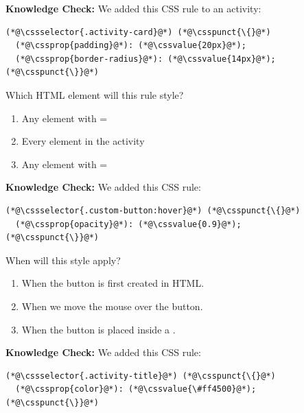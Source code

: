 \documentclass{article}
\begin{document}
\vspace{0.5cm}

\textbf{Knowledge Check:} We added this CSS rule to an activity:

\begin{lstlisting}
(*@\cssselector{.activity-card}@*) (*@\csspunct{\{}@*)
  (*@\cssprop{padding}@*): (*@\cssvalue{20px}@*);
  (*@\cssprop{border-radius}@*): (*@\cssvalue{14px}@*);
(*@\csspunct{\}}@*)
\end{lstlisting}

Which HTML element will this rule style?

\begin{enumerate}[label=\Alph*), topsep=4pt, itemsep=2pt, partopsep=0pt]
  \item Any element with =
  \item Every  element in the activity
  \item Any element with =
\end{enumerate}

\vspace{0.5cm}

\textbf{Knowledge Check:} We added this CSS rule:

\begin{lstlisting}
(*@\cssselector{.custom-button:hover}@*) (*@\csspunct{\{}@*)
  (*@\cssprop{opacity}@*): (*@\cssvalue{0.9}@*);
(*@\csspunct{\}}@*)
\end{lstlisting}

When will this style apply?

\begin{enumerate}[label=\Alph*), topsep=4pt, itemsep=2pt, partopsep=0pt]
  \item When the button is first created in HTML.
  \item When we move the mouse over the button.
  \item When the button is placed inside a .
\end{enumerate}

\vspace{0.5cm}

\textbf{Knowledge Check:} We added this CSS rule:

\begin{lstlisting}
(*@\cssselector{.activity-title}@*) (*@\csspunct{\{}@*)
  (*@\cssprop{color}@*): (*@\cssvalue{\#ff4500}@*);
(*@\csspunct{\}}@*)
\end{lstlisting}
\end{document}
